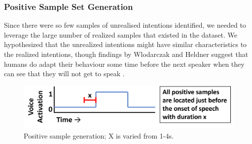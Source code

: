 \documentclass[sigconf]{acmart}
\begin{document}

\subsubsection{Positive Sample Set Generation}
Since there were so few samples of unrealised intentions identified, we needed to leverage the large number of realized samples that existed in the dataset. We hypothesized that the unrealized intentions might have similar characteristics to the realized intentions, though findings by Wlodarczak and Heldner suggest that humans do adapt their behaviour some time before the next speaker when they can see that they will not get to speak \cite{wlodarczak2020breathing}. 

\begin{figure}
  \includegraphics[width=\columnwidth]{vad10.png}
  \vspace{-4mm}
  \caption{Positive sample generation; X is varied from 1-4s.}
    \vspace{-2mm}
  \label{fig:vad}
\end{figure}
\end{document}
